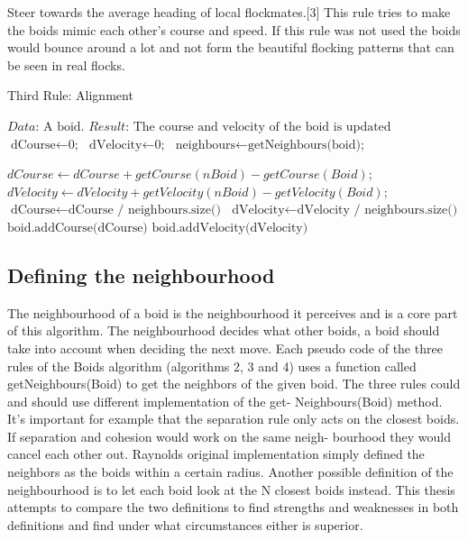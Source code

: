 \documentclass[12pt]{article}
\begin{document}
Steer towards the average heading of local flockmates.[3] This rule tries to make the boids mimic each other's course and speed. If this rule was not used the boids would bounce around a lot and not form the beautiful flocking patterns that can be seen in real flocks.

\begin{algorithm}
\caption{Third Rule: Alignment}\label{euclid}
\begin{algorithmic}[1]
\State $\textit{Data:   } \text{A boid.}$
\State $\textit{Result:   } \text{The course and velocity of the boid is updated}$
\\
\State $\text{dCourse} \gets \text{0;}$
\State $\text{dVelocity} \gets \text{0;}$
\State $\text{neighbours} \gets \text{getNeighbours(boid);}$

    \State $ dCourse \gets dCourse + getCourse(nBoid) - getCourse(Boid);$
    \State $ dVelocity \gets dVelocity + getVelocity(nBoid) - getVelocity(Boid);$
\Endfor
\State $\text{dCourse} \gets \text{dCourse / neighbours.size()}$
\State $\text{dVelocity} \gets \text{dVelocity / neighbours.size()}$
\State $\text{boid.addCourse(dCourse)}$
\State $\text{boid.addVelocity(dVelocity)}$
\end{algorithmic}

\end{algorithm}

\pagebreak
\subsection{Defining the neighbourhood}
The neighbourhood of a boid is the neighbourhood it perceives and is a core part of this algorithm. The neighbourhood decides what other boids, a boid should take into account when deciding the next move.
Each pseudo code of the three rules of the Boids algorithm (algorithms 2, 3
and 4) uses a function called getNeighbours(Boid) to get the neighbors of the given
boid. The three rules could and should use different implementation of the get-
Neighbours(Boid) method. It’s important for example that the separation rule only
acts on the closest boids. If separation and cohesion would work on the same neigh-
bourhood they would cancel each other out.
Raynolds original implementation simply defined the neighbors as the boids
within a certain radius. Another possible definition of the neighbourhood is to let
each boid look at the N closest boids instead. This thesis attempts to compare the
two definitions to find strengths and weaknesses in both definitions and find under
what circumstances either is superior.
\end{document}
